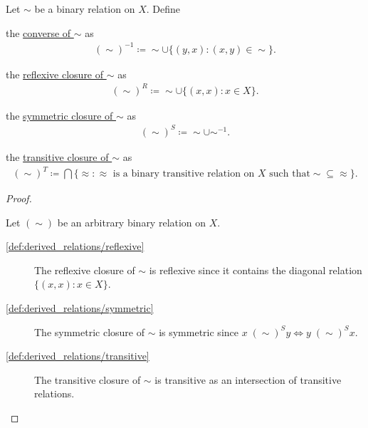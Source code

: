 \begin{definition}\label{def:derived_relations}
  Let $\sim$ be a binary relation on $X$. Define
  \begin{defenum}
    \item\label{def:derived_relations/converse} the \uline{converse of $\sim$} as
    \begin{align*}
      (\sim)^{-1} \coloneqq \sim \cup \{ (y, x) \colon (x, y) \in \sim \}.
    \end{align*}

    \item\label{def:derived_relations/reflexive} the \uline{reflexive closure of $\sim$} as
    \begin{align*}
      (\sim)^R \coloneqq \sim \cup \{ (x, x) \colon x \in X \}.
    \end{align*}

    \item\label{def:derived_relations/symmetric} the \uline{symmetric closure of $\sim$} as
    \begin{align*}
      (\sim)^S \coloneqq \sim \cup \sim^{-1}.
    \end{align*}

    \item\label{def:derived_relations/transitive} the \uline{transitive closure of $\sim$} as
    \begin{align*}
      (\sim)^T \coloneqq \bigcap \{ \approx \colon \approx \text{ is a binary transitive relation on $X$ such that} \sim \subseteq \approx \}.
    \end{align*}
  \end{defenum}
\end{definition}
\begin{proof}
\begin{itemize}
  Let $(\sim)$ be an arbitrary binary relation on $X$.

  \begin{description}
    \item[\ref{def:derived_relations/reflexive}] The reflexive closure of $\sim$ is reflexive since it contains the diagonal relation $\{ (x, x) \colon x \in X \}$.

    \item[\ref{def:derived_relations/symmetric}] The symmetric closure of $\sim$ is symmetric since $x \;(\sim)^S y \iff y \;(\sim)^S x$.

    \item[\ref{def:derived_relations/transitive}] The transitive closure of $\sim$ is transitive as an intersection of transitive relations.
  \end{description}
\end{itemize}
\end{proof}

